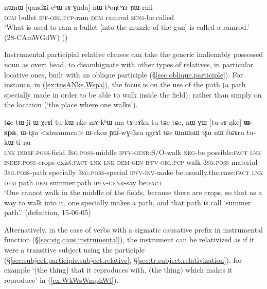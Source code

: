 \begin{exe}
\ex \label{ex:qandZi.chWsAGnda}
\gll nɯnɯ [qandʑi cʰɯ-sɤ-ɣnda] nɯ tʰoŋtʰɤr ɲɯ-rmi \\
\textsc{dem} bullet \textsc{ipf}-\textsc{obl}:\textsc{pcp}-ram \textsc{dem} ramrod \textsc{sens}-be.called \\
 \glt `What is used to ram a bullet [into the muzzle of the gun] is called a ramrod.' (28-CAmWGdW)
()
\end{exe} 
 
 Instrumental participial relative clauses can take the generic inalienably possessed noun  as overt head, to disambiguate with other types of relatives, in particular locative ones, built with an oblique participle (§\ref{sec:oblique.participle}). For instance, in (\ref{ex:tusANke.Wspa}), the focus is on the use of the path (a path specially made in order to be able to walk inside the field), rather than simply on the location (`the place where one walks').

\begin{exe}
\ex \label{ex:tusANke.Wspa}
\gll tɕe tɯ-ji ɯ-χcɤl tu-kɯ-ŋke mɤ-kʰɯ ma tɤ-rɤku tu tɕe tɕe, nɯ ɣɯ [tu-sɤ-ŋke] \textbf{ɯ-spa}, ɯ-tʂu <zhuanmen> ɯ-rkoz ɲɯ́-wɣ-βzu ŋgrɤl tɕe ɯnɯnɯ tʂu nɯ ftɕɤru tu-kɯ-ti ŋu \\
\textsc{lnk} \textsc{indef}.\textsc{poss}-field \textsc{3sg}.\textsc{poss}-middle \textsc{ipfv}-\textsc{genr}:S/O-walk \textsc{neg}-be.possible:\textsc{fact} \textsc{lnk} \textsc{indef}.\textsc{poss}-crops exist:\textsc{fact} \textsc{lnk} \textsc{lnk} \textsc{dem} \textsc{gen} \textsc{ipfv}-\textsc{obl}:\textsc{pcp}-walk \textsc{3sg}.\textsc{poss}-material \textsc{3sg}.\textsc{poss}-path specially \textsc{3sg}.\textsc{poss}-special \textsc{ipfv}-\textsc{inv}-make be.usually.the.case:\textsc{fact} \textsc{lnk} \textsc{dem} path \textsc{dem} summer.path \textsc{ipfv}-\textsc{genr}-say be:\textsc{fact} \\
\glt `One cannot walk in the middle of the fields, because there are crops, so that as a way to walk into it, one specially makes a path, and that path is call `summer path'.' (definition, 15-06-05)
\end{exe} 

Alternatively, in the case of verbs with a sigmatic causative prefix in instrumental function (§\ref{sec:sig.caus.instrumental}), the instrument can be relativized as if it were a transitive subject using the  participle (§\ref{sec:subject.participle.subject.relative}, §\ref{sec:tr.subject.relativization}), for example  `(the thing) that it reproduces with, (the thing) which makes it reproduce' in (\ref{ex:WkWsWmphWl}).

